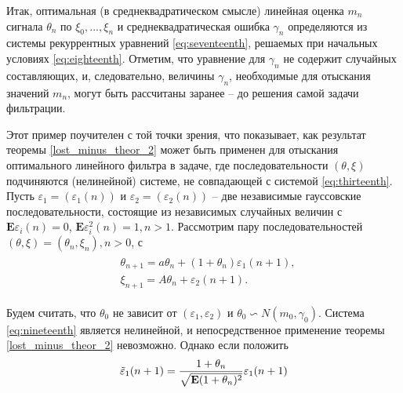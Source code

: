 \begin{example}
	Итак, оптимальная (в среднеквадратическом смысле) линейная оценка $m_n$ сигнала $\theta_n$ по $\xi_0, ..., \xi_n$ и среднеквадратическая ошибка $\gamma_n$ определяются из системы рекуррентных уравнений \eqref{eq:seventeenth}, решаемых при начальных условиях \eqref{eq:eighteenth}. Отметим, что уравнение для $\gamma_n$ не содержит случайных составляющих, и, следовательно, величины $\gamma_n$, необходимые для отыскания значений $m_n$, могут быть рассчитаны заранее – до решения самой задачи фильтрации.
\end{example}

\begin{example}
	Этот пример поучителен с той точки зрения, что показывает, как результат теоремы \ref{lost_minus_theor_2} может быть применен для отыскания оптимального линейного фильтра в задаче, где последовательности $(\theta, \xi)$ подчиняются (нелинейной) системе, не совпадающей с системой \eqref{eq:thirteenth}. Пусть $\varepsilon_1 = (\varepsilon_1 (n))$ и $\varepsilon_2 = (\varepsilon_2 (n))$ – две независимые гауссовские последовательности, состоящие из независимых случайных величин с $\mathbf{E}\varepsilon_i (n) = 0$, $\mathbf{E}\varepsilon^2_i (n) = 1, n > 1$. Рассмотрим пару последовательностей $(\theta, \xi) = (\theta_n, \xi_n),
	n > 0$, с
	\begin{align}
	\label{eq:nineteenth}
	\begin{split}
	& \theta_{n+1} = a\theta_n + (1 + \theta_n)\varepsilon_1 (n + 1), \\
	& \xi_{n+1} = A\theta_n + \varepsilon_2 (n + 1).
	\end{split}
	\end{align}
	
	Будем считать, что $\theta_0$ не зависит от $(\varepsilon_1, \varepsilon_2)$ и $\theta_0 \backsim N (m_0, \gamma_0)$. Система \eqref{eq:nineteenth} является нелинейной, и непосредственное применение теоремы \ref{lost_minus_theor_2} невозможно. Однако если положить
	\begin{align*}
	\Tilde{\varepsilon}_1(n + 1) = \frac{1 + \theta_n}{\sqrt{\mathbf{E}(1+\theta_n)^2}} \varepsilon_1(n + 1)
	\end{align*}
	

\end{example}
